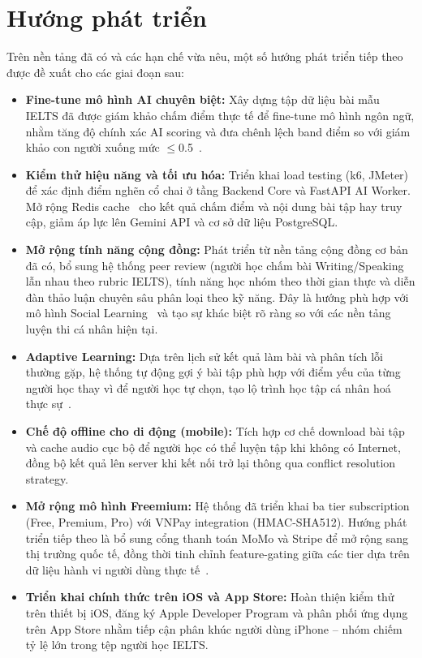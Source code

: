 \section{Hướng phát triển}

Trên nền tảng đã có và các hạn chế vừa nêu, một số hướng phát triển tiếp theo được đề xuất cho các giai đoạn sau:

\begin{itemize}
    \item \textbf{Fine-tune mô hình AI chuyên biệt:} Xây dựng tập dữ liệu bài mẫu IELTS đã được giám khảo chấm điểm thực tế để fine-tune mô hình ngôn ngữ, nhằm tăng độ chính xác AI scoring và đưa chênh lệch band điểm so với giám khảo con người xuống mức $\leq$0.5~\cite{nguyen2026aiwriting}.

    \item \textbf{Kiểm thử hiệu năng và tối ưu hóa:} Triển khai load testing (k6, JMeter) để xác định điểm nghẽn cổ chai ở tầng Backend Core và FastAPI AI Worker. Mở rộng Redis cache~\cite{redis-docs} cho kết quả chấm điểm và nội dung bài tập hay truy cập, giảm áp lực lên Gemini API và cơ sở dữ liệu PostgreSQL.

    \item \textbf{Mở rộng tính năng cộng đồng:} Phát triển từ nền tảng cộng đồng cơ bản đã có, bổ sung hệ thống peer review (người học chấm bài Writing/Speaking lẫn nhau theo rubric IELTS), tính năng học nhóm theo thời gian thực và diễn đàn thảo luận chuyên sâu phân loại theo kỹ năng. Đây là hướng phù hợp với mô hình Social Learning~\cite{vygotsky1978mind} và tạo sự khác biệt rõ ràng so với các nền tảng luyện thi cá nhân hiện tại.

    \item \textbf{Adaptive Learning:} Dựa trên lịch sử kết quả làm bài và phân tích lỗi thường gặp, hệ thống tự động gợi ý bài tập phù hợp với điểm yếu của từng người học thay vì để người học tự chọn, tạo lộ trình học tập cá nhân hoá thực sự~\cite{nguyen2024aiteaching}.

    \item \textbf{Chế độ offline cho di động (mobile):} Tích hợp cơ chế download bài tập và cache audio cục bộ để người học có thể luyện tập khi không có Internet, đồng bộ kết quả lên server khi kết nối trở lại thông qua conflict resolution strategy.

    \item \textbf{Mở rộng mô hình Freemium:} Hệ thống đã triển khai ba tier subscription (Free, Premium, Pro) với VNPay integration (HMAC-SHA512). Hướng phát triển tiếp theo là bổ sung cổng thanh toán MoMo và Stripe để mở rộng sang thị trường quốc tế, đồng thời tinh chỉnh feature-gating giữa các tier dựa trên dữ liệu hành vi người dùng thực tế~\cite{statista-elearning}.

    \item \textbf{Triển khai chính thức trên iOS và App Store:} Hoàn thiện kiểm thử trên thiết bị iOS, đăng ký Apple Developer Program và phân phối ứng dụng trên App Store nhằm tiếp cận phân khúc người dùng iPhone -- nhóm chiếm tỷ lệ lớn trong tệp người học IELTS.
\end{itemize}


